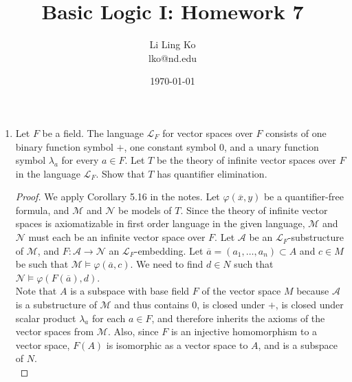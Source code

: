 \documentclass{article}
\begin{document}
\title{Basic Logic I: Homework 7}
\author{Li Ling Ko\\ lko@nd.edu}
\date{\today}
\maketitle

\begin{enumerate}[label={\bf Q\arabic*:}]
  \item Let $F$ be a field. The language $\mathcal{L}_F$ for vector spaces
    over $F$ consists of one binary function symbol $+$, one constant
    symbol $0$, and a unary function symbol $\lambda_a$ for every $a\in F$.
    Let $T$ be the theory of infinite vector spaces over $F$ in the
    language $\mathcal{L}_F$. Show that $T$ has quantifier elimination.

    \begin{proof}
      We apply Corollary 5.16 in the notes.  Let $\varphi(\overline{x},y)$
      be a quantifier-free formula, and $\mathcal{M}$ and $\mathcal{N}$ be
      models of $T$. Since the theory of infinite vector spaces is
      axiomatizable in first order language in the given language,
      $\mathcal{M}$ and $\mathcal{N}$ must each be an infinite vector space
      over $F$. Let $\mathcal{A}$ be an $\mathcal{L}_F$-substructure of
      $\mathcal{M}$, and $F:\mathcal{A}\rightarrow\mathcal{N}$ an
      $\mathcal{L}_F$-embedding. Let $\overline{a}=(a_1,\ldots,a_n)\subset
      A$ and $c\in M$ be such that
      $\mathcal{M}\models\varphi(\overline{a},c)$. We need to find $d\in N$
      such that $\mathcal{N}\models\varphi(F(\overline{a}),d)$. \\

      Note that $A$ is a subspace with base field $F$ of the vector space
      $M$ because $\mathcal{A}$ is a substructure of $\mathcal{M}$ and thus
      contains $0$, is closed under $+$, is closed under scalar product
      $\lambda_a$ for each $a\in F$, and therefore inherits the axioms of
      the vector spaces from $\mathcal{M}$.
      Also, since $F$ is an injective homomorphism to a vector space,
      $F(A)$ is isomorphic as a vector space to $A$, and is a subspace of
      $N$. \\


\end{proof}
\end{enumerate}
\end{document}
